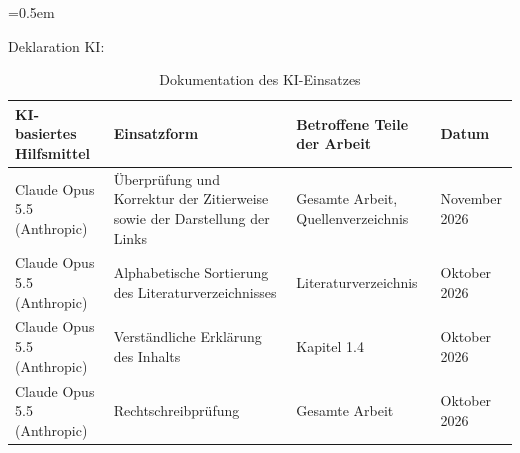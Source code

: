 \begin{list}{}{\leftmargin=1.27cm \itemindent=-1.27cm \itemsep=0.5em}
\item Deklaration KI:
\begin{table}[h]
\centering
\small
\begin{tabularx}{\textwidth}{>{\raggedright\arraybackslash}p{3.2cm} X >{\raggedright\arraybackslash}p{3.2cm} >{\raggedright\arraybackslash}p{2.4cm}}
\toprule
\textbf{KI-basiertes Hilfsmittel} & \textbf{Einsatzform} & \textbf{Betroffene Teile der Arbeit} & \textbf{Datum} \\
\midrule
Claude Opus 5.5 (Anthropic) & Überprüfung und Korrektur der Zitierweise sowie der Darstellung der Links & Gesamte Arbeit, Quellenverzeichnis & November 2026 \\
Claude Opus 5.5 (Anthropic) & Alphabetische Sortierung des Literaturverzeichnisses & Literaturverzeichnis & Oktober 2026 \\
Claude Opus 5.5 (Anthropic) & Verständliche Erklärung des Inhalts & Kapitel 1.4 & Oktober 2026 \\
Claude Opus 5.5 (Anthropic) & Rechtschreibprüfung & Gesamte Arbeit & Oktober 2026 \\
\bottomrule
\end{tabularx}
\caption{Dokumentation des KI-Einsatzes}
\end{table}
\end{list}